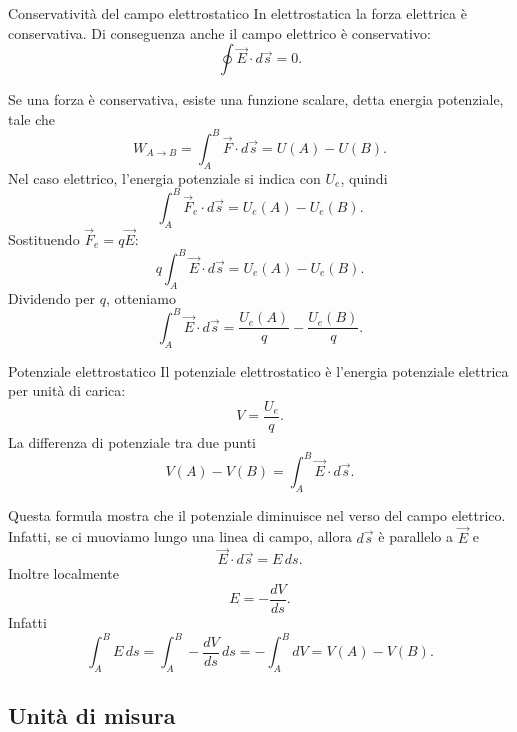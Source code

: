 \documentclass[a4paper]{article}
\begin{document}
\begin{snippetproposition}{Conservatività del campo elettrostatico}
    In elettrostatica la forza elettrica è conservativa. Di conseguenza anche il campo elettrico è conservativo:
    \[
        \oint \vec{E}\cdot d\vec{s}=0.
    \]
\end{snippetproposition}

\begin{center}
\end{center}

Se una forza è conservativa, esiste una funzione scalare, detta energia potenziale, tale che
\[
    W_{A\to B}=\int_A^B \vec{F}\cdot d\vec{s}=U(A)-U(B).
\]
Nel caso elettrico, l'energia potenziale si indica con \(U_e\), quindi
\[
    \int_A^B \vec{F}_e\cdot d\vec{s}=U_e(A)-U_e(B).
\]
Sostituendo \(\vec{F}_e=q\vec{E}\):
\[
    q\int_A^B \vec{E}\cdot d\vec{s}=U_e(A)-U_e(B).
\]
Dividendo per \(q\), otteniamo
\[
    \int_A^B \vec{E}\cdot d\vec{s}=\frac{U_e(A)}{q}-\frac{U_e(B)}{q}.
\]

\begin{snippetdefinition}{Potenziale elettrostatico}
    Il potenziale elettrostatico è l'energia potenziale elettrica per unità di carica:
    \[
        V=\frac{U_e}{q}.
    \]
    La differenza di potenziale tra due punti
    \[
        V(A)-V(B)=\int_A^B \vec{E}\cdot d\vec{s}.
    \]
\end{snippetdefinition}

Questa formula mostra che il potenziale diminuisce nel verso del campo elettrico. Infatti, se ci muoviamo lungo una linea di campo, allora \(d\vec{s}\) è parallelo a \(\vec{E}\) e
\[
    \vec{E}\cdot d\vec{s}=E\,ds.
\]
Inoltre localmente
\[
    E=-\frac{dV}{ds}.
\]
Infatti
\[
    \int_A^B E\,ds=\int_A^B -\frac{dV}{ds}\,ds
    =-\int_A^B dV
    =V(A)-V(B).
\]

\subsection{Unità di misura}
\end{document}
